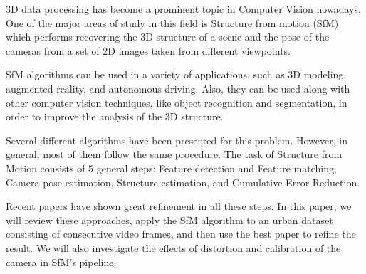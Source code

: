 \documentclass[11pt]{article}
\begin{document}
3D data processing has become a prominent topic in Computer Vision nowadays.
One of the major areas of study in this field is Structure from motion (SfM)
which performs recovering the 3D structure of a scene and the pose of the
cameras from a set of 2D images taken from different viewpoints.

SfM algorithms can be used in a variety of applications, such as 3D modeling,
augmented reality, and autonomous driving.
Also, they can be used along with other computer vision techniques, like
object recognition and segmentation, in order to improve the analysis of the 3D structure.

Several different algorithms have been presented for this problem.
However, in general, most of them follow the same procedure.
The task of Structure from Motion consists of 5 general steps:
Feature detection and Feature matching, Camera pose estimation, Structure estimation, and Cumulative Error Reduction.

Recent papers have shown great refinement in all these steps.
In this paper, we will review these approaches, apply the SfM algorithm to an urban
dataset consisting of consecutive video frames, and then use the best paper to refine the result.
We will also investigate the effects of distortion and calibration of the camera in SfM's pipeline.
\end{document}
